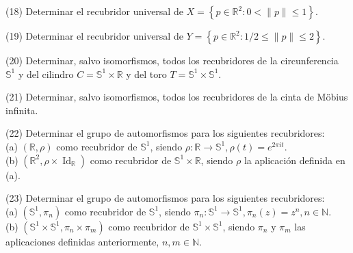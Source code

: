 \documentclass[
  a4paper,
  spanish,
  12pt,
]{scrartcl}
\begin{document}
\begin{ejer}
(18) Determinar el recubridor universal de $X=\left\{p \in \mathbb{R}^{2}: 0<\|p\| \leq 1\right\}$.\\
\end{ejer}

\begin{ejer}
(19) Determinar el recubridor universal de $Y=\left\{p \in \mathbb{R}^{2}: 1 / 2 \leq\|p\| \leq 2\right\}$.\\
\end{ejer}

\begin{ejer}
(20) Determinar, salvo isomorfismos, todos los recubridores de la circunferencia $\mathbb{S}^{1}$ y del cilindro $C=\mathbb{S}^{1} \times \mathbb{R}$ y del toro $T=\mathbb{S}^{1} \times \mathbb{S}^{1}$.\\
\end{ejer}

\begin{ejer}
(21) Determinar, salvo isomorfismos, todos los recubridores de la cinta de Möbius infinita.\\
\end{ejer}

\begin{ejer}
(22) Determinar el grupo de automorfismos para los siguientes recubridores:\\
(a) $(\mathbb{R}, \rho)$ como recubridor de $\mathbb{S}^{1}$, siendo $\rho: \mathbb{R} \rightarrow \mathbb{S}^{1}, \rho(t)=e^{2 \pi i t}$.\\
(b) $\left(\mathbb{R}^{2}, \rho \times \operatorname{Id}_{\mathbb{R}}\right)$ como recubridor de $\mathbb{S}^{1} \times \mathbb{R}$, siendo $\rho$ la aplicación definida en (a).\\
\end{ejer}

\begin{ejer}
(23) Determinar el grupo de automorfismos para los siguientes recubridores:\\
(a) $\left(\mathbb{S}^{1}, \pi_{n}\right)$ como recubridor de $\mathbb{S}^{1}$, siendo $\pi_{n}: \mathbb{S}^{1} \rightarrow \mathbb{S}^{1}, \pi_{n}(z)=z^{n}, n \in \mathbb{N}$.\\
(b) $\left(\mathbb{S}^{1} \times \mathbb{S}^{1}, \pi_{n} \times \pi_{m}\right)$ como recubridor de $\mathbb{S}^{1} \times \mathbb{S}^{1}$, siendo $\pi_{n}$ y $\pi_{m}$ las aplicaciones definidas anteriormente, $n, m \in \mathbb{N}$.\\
\end{ejer}
\end{document}
